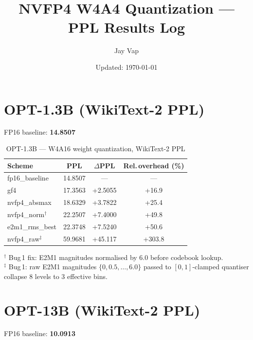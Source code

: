 \documentclass{article}
\title{NVFP4 W4A4 Quantization --- PPL Results Log}
\author{Jay Vap}
\date{Updated: \today}
\begin{document}
\maketitle

\section{OPT-1.3B (WikiText-2 PPL)}

FP16 baseline: \textbf{14.8507}

\begin{table}[h]
\centering
\caption{OPT-1.3B --- W4A16 weight quantization, WikiText-2 PPL}
\label{tab:opt1.3b}
\begin{tabular}{l S[table-format=2.4] S[table-format=+2.4] S[table-format=+3.1,table-sign-mantissa]}
\toprule
Scheme & {PPL} & {$\Delta$PPL} & {Rel.\,overhead (\%)} \\
\midrule
fp16\_baseline            & 14.8507 & {---}   & {---}   \\
\addlinespace[2pt]
gf4                       & 17.3563 & +2.5055 & +16.9   \\
nvfp4\_absmax             & 18.6329 & +3.7822 & +25.4   \\
nvfp4\_norm$^\dagger$     & 22.2507 & +7.4000 & +49.8   \\
e2m1\_rms\_best           & 22.3748 & +7.5240 & +50.6   \\
nvfp4\_raw$^\ddagger$     & 59.9681 & +45.117 & +303.8  \\
\bottomrule
\end{tabular}
\end{table}

$^\dagger$ Bug\,1 fix: E2M1 magnitudes normalised by 6.0 before codebook lookup.\\
$^\ddagger$ Bug\,1: raw E2M1 magnitudes $\{0, 0.5, \ldots, 6.0\}$ passed to $[0,1]$-clamped
quantiser collapse 8 levels to 3 effective bins.

\section{OPT-13B (WikiText-2 PPL)}

FP16 baseline: \textbf{10.0913}
\end{document}
